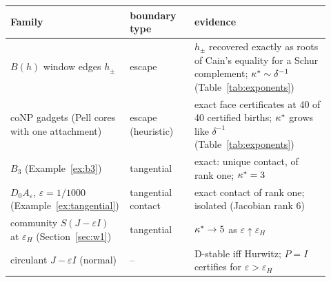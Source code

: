 \begin{tabular}{@{}L{0.3\linewidth}L{0.2\linewidth}L{0.42\linewidth}@{}}
\toprule
Family & boundary type & evidence \\
\midrule
$B(h)$ window edges $h_\pm$ \cite{companion_attach} & escape & $h_\pm$ recovered exactly as roots of Cain's equality for a Schur complement; $\kappa^{*}\sim\delta^{-1}$ (Table~\ref{tab:exponents}) \\
coNP gadgets (Pell cores with one attachment) \cite{companion_conp} & escape (heuristic) & exact face certificates at 40 of 40 certified births; $\kappa^{*}$ grows like $\delta^{-1}$ (Table~\ref{tab:exponents}) \\
$B_3$ (Example~\ref{ex:b3}) & tangential & exact: unique contact, of rank one; $\kappa^{*}=3$ \\
$D_0A_\varepsilon$, $\varepsilon=1/1000$ (Example~\ref{ex:tangential}) & tangential contact & exact contact of rank one; isolated (Jacobian rank 6) \\
community $S(J-\varepsilon I)$ at $\varepsilon_H$ (Section~\ref{sec:w1}) & tangential & $\kappa^{*}\to5$ as $\varepsilon\uparrow\varepsilon_H$ \\
circulant $J-\varepsilon I$ (normal) & -- & D-stable iff Hurwitz; $P=I$ certifies for $\varepsilon>\varepsilon_H$ \\
\bottomrule
\end{tabular}
